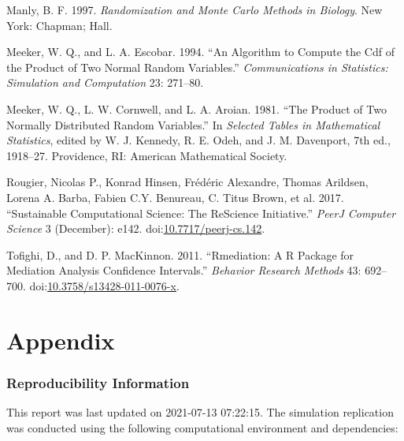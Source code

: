 \documentclass[10,a4paperpaper,]{article}
\begin{document}
\hypertarget{ref-manly97}{}
Manly, B. F. 1997. \emph{Randomization and Monte Carlo Methods in
Biology}. New York: Chapman; Hall.

\hypertarget{ref-meeker94}{}
Meeker, W. Q., and L. A. Escobar. 1994. ``An Algorithm to Compute the
Cdf of the Product of Two Normal Random Variables.''
\emph{Communications in Statistics: Simulation and Computation} 23:
271--80.

\hypertarget{ref-meeker81}{}
Meeker, W. Q., L. W. Cornwell, and L. A. Aroian. 1981. ``The Product of
Two Normally Distributed Random Variables.'' In \emph{Selected Tables in
Mathematical Statistics}, edited by W. J. Kennedy, R. E. Odeh, and J. M.
Davenport, 7th ed., 1918--27. Providence, RI: American Mathematical
Society.

\hypertarget{ref-rougier_sustainable_2017-1}{}
Rougier, Nicolas P., Konrad Hinsen, Frédéric Alexandre, Thomas Arildsen,
Lorena A. Barba, Fabien C.Y. Benureau, C. Titus Brown, et al. 2017.
``Sustainable Computational Science: The ReScience Initiative.''
\emph{PeerJ Computer Science} 3 (December): e142.
doi:\href{https://doi.org/10.7717/peerj-cs.142}{10.7717/peerj-cs.142}.

\hypertarget{ref-tofighi11}{}
Tofighi, D., and D. P. MacKinnon. 2011. ``Rmediation: A R Package for
Mediation Analysis Confidence Intervals.'' \emph{Behavior Research
Methods} 43: 692--700.
doi:\href{https://doi.org/10.3758/s13428-011-0076-x}{10.3758/s13428-011-0076-x}.

\FloatBarrier
\endgroup
\newpage

\section*{Appendix}

\subsubsection*{Reproducibility Information}

This report was last updated on 2021-07-13 07:22:15. The simulation
replication was conducted using the following computational environment
and dependencies:

\FloatBarrier
\end{document}
